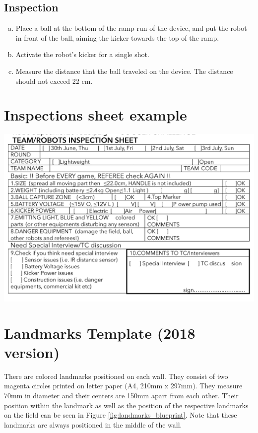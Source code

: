 \documentclass{article}
\begin{document}
\subsection{Inspection}

\begin{enumerate}[a.]
    \item Place a ball at the bottom of the ramp run of the
        device, and put the robot in front of the ball, aiming the kicker
        towards the top of the ramp.

    \item Activate the robot's kicker for a single shot.

    \item Measure the distance that the ball traveled on the device. The
        distance should not exceed 22 cm.

\end{enumerate}


\section{Inspections sheet example\label{ref-065}}

\includegraphics[width=1\textwidth]{media/image10.png}

\newpage
\section{Landmarks Template (2018 version)\label{landmarks}}

There are colored landmarks positioned on each wall. They consist
of two magenta circles printed on letter paper (A4, 210mm x 297mm). They
measure 70mm in diameter and their centers are 150mm apart from each other.
Their position within the landmark as well as the position of the
respective landmarks on the field can be seen in Figure
\ref{fig:landmarks_blueprint}. Note that these landmarks are always positioned
in the middle of the wall.
\end{document}
